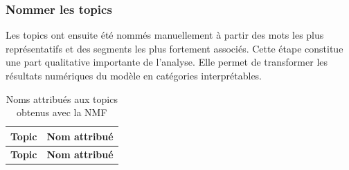 \subsubsection{Nommer les topics}

Les topics ont ensuite été nommés manuellement à partir des mots les plus représentatifs et des segments les plus fortement associés. Cette étape constitue une part qualitative importante de l'analyse. Elle permet de transformer les résultats numériques du modèle en catégories interprétables.
\newpage 

\begin{longtable}{p{2cm}p{11cm}}
\caption{Noms attribués aux topics obtenus avec la NMF} \\
\toprule
\textbf{Topic} & \textbf{Nom attribué} \\
\midrule
\endfirsthead

\toprule
\textbf{Topic} & \textbf{Nom attribué} \\
\midrule
\endhead


\end{longtable}
